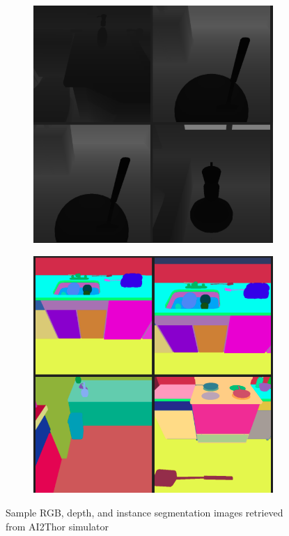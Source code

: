 \documentclass[11pt,a4paper]{article}
\begin{document}
\begin{figure}
\begin{subfigure}[b]{0.32\textwidth}
         \includegraphics[width=\textwidth]{figures/depth.png}
         \caption{}
     \end{subfigure}
     \hfill
     \begin{subfigure}[b]{0.32\textwidth}
         \centering
         \includegraphics[width=\textwidth]{figures/seg.png}
         \caption{}
     \end{subfigure}
        \caption{Sample RGB, depth, and instance segmentation images retrieved from AI2Thor simulator}
        \label{fig:sample_ims}
\end{figure}
\end{document}
